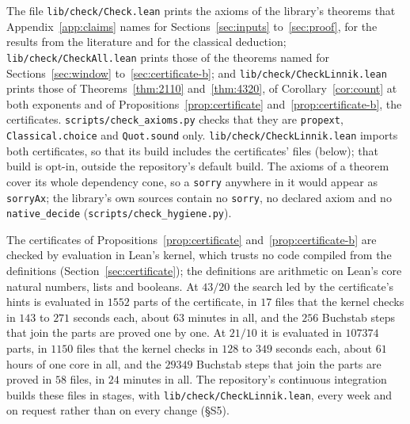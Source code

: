 \documentclass[11pt]{article}
\theoremstyle{definition}
\newcommand{\lean}[1]{\texttt{#1}}
\newcommand{\file}[1]{\nolinkurl{#1}}
\begin{document}
The file \file{lib/check/Check.lean}
prints the axioms of the library's theorems that Appendix~\ref{app:claims} names for Sections~\ref{sec:inputs}
to~\ref{sec:proof}, for the results from the literature and for the classical deduction;
\file{lib/check/CheckAll.lean} prints those of the theorems named for Sections~\ref{sec:window}
to~\ref{sec:certificate-b}; and \file{lib/check/CheckLinnik.lean} prints those of Theorems~\ref{thm:2110}
and~\ref{thm:4320}, of Corollary~\ref{cor:count} at both exponents and of Propositions~\ref{prop:certificate}
and~\ref{prop:certificate-b}, the certificates. \file{scripts/check\_axioms.py} checks
that they are \lean{propext}, \lean{Classical.choice} and \lean{Quot.sound} only. \file{lib/check/CheckLinnik.lean}
imports both certificates, so that its build includes the certificates' files (below); that build is opt-in, outside
the repository's default build. The axioms of a theorem cover its
whole dependency
cone, so a \lean{sorry} anywhere in it would appear as \lean{sorryAx}; the library's own sources contain no
\lean{sorry}, no declared axiom and no \lean{native\_decide} (\file{scripts/check\_hygiene.py}).

The certificates of Propositions~\ref{prop:certificate} and~\ref{prop:certificate-b} are checked by evaluation in
Lean's kernel, which trusts no code compiled from the definitions (Section~\ref{sec:certificate}); the definitions are
arithmetic on Lean's core natural numbers, lists and booleans. At $43/20$ the search led by the certificate's hints is
evaluated in $1552$ parts of the certificate, in $17$ files that the kernel checks in $143$ to $271$ seconds each,
about $63$ minutes in all, and the $256$ Buchstab steps that join the parts are proved one by one. At $21/10$ it is
evaluated in $107374$ parts, in $1150$ files that the kernel checks in $128$ to $349$ seconds each, about $61$ hours
of one core in all, and the $29349$ Buchstab steps that join the parts are proved in $58$ files, in $24$ minutes in
all. The repository's continuous integration builds these files in stages, with \file{lib/check/CheckLinnik.lean},
every week and on request rather than on every change (\S S5).
\end{document}
